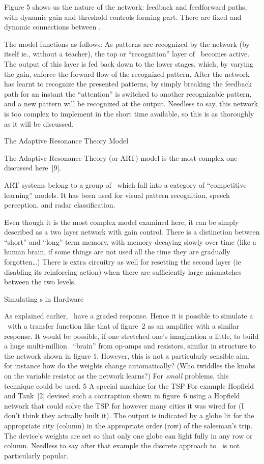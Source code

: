 Figure 5 shows us the nature of the network: feedback and feedforward
paths, with dynamic gain and threshold controls forming part.
There are fixed and dynamic connections between \neus.

The model functions as follows: As patterns are recognized by the
network (by itself ie., without a teacher), the top or ``recognition''
layer of \neus\ becomes active.
The output of this layer is fed back down to the lower stages, which, by
varying the gain, enforce the forward flow of the recognized pattern.
After the network has learnt to recognize the presented patterns, by
simply breaking the feedback path for an instant the ``attention'' is
switched to another recognizable pattern, and a new pattern will be
recognized at the output.
Needless to say, this network is too complex to implement in the short
time available, so this is as thoroughly as it will be discussed.

\ssec The Adaptive Resonance Theory Model

The Adaptive Resonance Theory (or ART) model is the most complex one
discussed here~[9].

ART systems belong to a group of \nns\ which fall into a category of
``competitive learning'' models.
It has been used for visual pattern recognition, speech perception, and
radar classification.

Even though it is the most complex model examined here, it can be
simply described as a two layer network with gain control.
There is a distinction between ``short'' and ``long'' term memory, with
memory decaying slowly over time (like a human brain, if some things are not
used all the time they are gradually forgotten\dots)
There is extra circuitry as well for resetting the second layer (ie
disabling its reinforcing action) when there are sufficiently large
mismatches between the two levels.

\sec Simulating \NN s in Hardware

As explained earlier, \neus\ have a graded response.
Hence it is possible to simulate a \neu\ with a transfer function like
that of figure~2 as an amplifier with a similar response.
It would be possible, if one stretched one's imagination a little, to
build a huge multi-million \neu\ ``brain'' from op-amps and resistors,
similar in structure to the network shown in figure 1.
However, this is not a particularly sensible aim, for instance how do
the weights change automatically? (Who twiddles the knobs on the
variable resistor as the network learns?)
For {\sl small\/} problems, this technique could be used.
 {5} {A special machine for the TSP}
For example Hopfield and Tank~[2] devised such a contraption shown in
figure~6 using a Hopfield network that could solve the TSP for however
many cities it was wired for (I don't think they actually built it).
The output is indicated by a globe lit for the appropriate city (column)
in the appropriate order (row) of the salesman's trip.
The device's weights are set so that only one globe can light fully in
any row or column.
Needless to say after that example the discrete approach to \nns\ is not
particularly popular.

